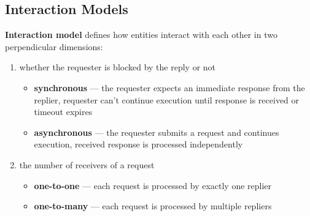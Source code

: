 \documentclass[thesis=M,english,hidelinks]{FITthesis}[2012/10/20]
\begin{document}
\subsection{Interaction Models}

\textbf{Interaction model} defines how entities interact with each other in two perpendicular dimensions:
\begin{enumerate}
    \item whether the requester is blocked by the reply or not
    \begin{itemize}
        \item \textbf{synchronous} --- the requester expects an immediate response from the replier, requester can't continue execution until response is received or timeout expires
        \item \textbf{asynchronous} --- the requester submits a request and continues execution, received response is processed independently
    \end{itemize}
    
    \item the number of receivers of a request
    \begin{itemize}
        \item \textbf{one-to-one} ---  each request is processed by exactly one replier
        \item \textbf{one-to-many} --- each request is processed by multiple repliers
    \end{itemize}
\end{enumerate}
\end{document}
